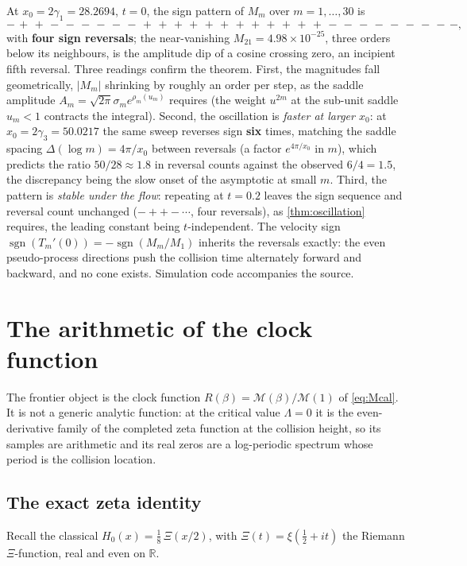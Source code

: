 \documentclass[11pt,reqno]{amsart}
\theoremstyle{plain}
\theoremstyle{definition}
\theoremstyle{remark}
\newcommand{\R}{\mathbb R}
\newcommand{\Mcal}{\mathcal M}
\DeclareMathOperator{\sgn}{sgn}
\begin{document}
\noindent At $x_0=2\gamma_1=28.2694$, $t=0$, the sign pattern of $M_m$ over
$m=1,\dots,30$ is
\[
  -\,+\,+\,-\,-\,-\,-\,-\,-\,+\,+\,+\,+\,+\,+\,+\,+\,+\,+\,+\,+\,
  -\,-\,-\,-\,-\,-\,-\,-\,-,
\]
with \textbf{four sign reversals}; the near-vanishing $M_{21}=4.98\times
10^{-25}$, three orders below its neighbours, is the amplitude dip of a
cosine crossing zero, an incipient fifth reversal. Three readings confirm
the theorem. First, the magnitudes fall geometrically, $|M_m|$ shrinking
by roughly an order per step, as the saddle amplitude
$A_m=\sqrt{2\pi}\sigma_me^{\rho_m(u_m)}$ requires (the weight $u^{2m}$ at the
sub-unit saddle $u_m<1$ contracts the integral). Second, the oscillation is
\emph{faster at larger $x_0$}: at $x_0=2\gamma_3=50.0217$ the same sweep
reverses sign \textbf{six} times, matching the saddle spacing
$\Delta(\log m)=4\pi/x_0$ between reversals (a factor $e^{4\pi/x_0}$ in $m$),
which predicts the ratio $50/28\approx1.8$ in reversal counts against the
observed $6/4=1.5$, the discrepancy being the slow onset of the asymptotic
at small $m$. Third, the pattern is \emph{stable under the flow}: repeating
at $t=0.2$ leaves the sign sequence and reversal count unchanged
($-{+}{+}{-}\cdots$, four reversals), as \cref{thm:oscillation} requires,
the leading constant being $t$-independent. The velocity sign
$\sgn(T_m'(0))=-\sgn(M_m/M_1)$ inherits the reversals exactly: the even
pseudo-process directions push the collision time alternately forward and
backward, and no cone exists. Simulation code accompanies the source.

\section{The arithmetic of the clock function}\label{sec:arithmetic}

The frontier object is the clock function $R(\beta)=\Mcal(\beta)/\Mcal(1)$
of \eqref{eq:Mcal}. It is not a generic analytic function: at the critical
value $\Lambda=0$ it is the even-derivative family of the completed zeta
function at the collision height, so its samples are arithmetic and its real
zeros are a log-periodic spectrum whose period is the collision location.

\subsection{The exact zeta identity}
Recall the classical $H_0(x)=\tfrac18\,\Xi(x/2)$, with $\Xi(t)=\xi(\tfrac12+
it)$ the Riemann $\Xi$-function, real and even on $\R$.
\end{document}

